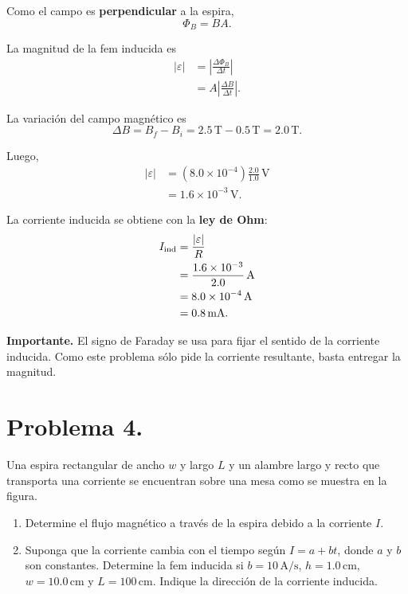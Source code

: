 \documentclass[11pt]{article}
\newcommand{\importante}[1]{%
  \par\medskip
  \noindent\textbf{Importante.} #1\par
}
\begin{document}
Como el campo es \textbf{perpendicular} a la espira,
\begin{equation*}
    \Phi_B=BA.
\end{equation*}

La magnitud de la fem inducida es
\begin{align*}
    |\varepsilon|
    &=\left|\frac{\Delta\Phi_B}{\Delta t}\right| \\
    &=A\left|\frac{\Delta B}{\Delta t}\right|.
\end{align*}

La variaci\'on del campo magn\'etico es
\begin{equation*}
    \Delta B=B_f-B_i=2.5\,\mathrm{T}-0.5\,\mathrm{T}=2.0\,\mathrm{T}.
\end{equation*}

Luego,
\begin{align*}
    |\varepsilon|
    &=(8.0\times10^{-4})\frac{2.0}{1.0}\,\mathrm{V} \\
    &=1.6\times10^{-3}\,\mathrm{V}.
\end{align*}

La corriente inducida se obtiene con la \textbf{ley de Ohm}:
\begin{align*}
    I_{\rm ind}
    &=\frac{|\varepsilon|}{R} \\
    &=\frac{1.6\times10^{-3}}{2.0}\,\mathrm{A} \\
    &=8.0\times10^{-4}\,\mathrm{A} \\
    &=0.8\,\mathrm{mA}.
\end{align*}

\importante{El signo de Faraday se usa para fijar el sentido de la corriente inducida. Como este problema s\'olo pide la corriente resultante, basta entregar la magnitud.}


\clearpage

\section*{Problema 4.}
Una espira rectangular de ancho $w$ y largo $L$ y un alambre largo y recto que transporta una corriente se encuentran sobre una mesa como se muestra en la figura.
\begin{enumerate}[label=(\alph*)]
    \item Determine el flujo magn\'etico a trav\'es de la espira debido a la corriente $I$.
    \item Suponga que la corriente cambia con el tiempo seg\'un $I=a+bt$, donde $a$ y $b$ son constantes. Determine la fem inducida si $b=10\,\mathrm{A/s}$, $h=1.0\,\mathrm{cm}$, $w=10.0\,\mathrm{cm}$ y $L=100\,\mathrm{cm}$. Indique la direcci\'on de la corriente inducida.
\end{enumerate}
\end{document}
